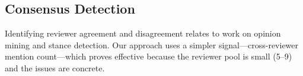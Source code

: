 \subsection{Consensus Detection}

Identifying reviewer agreement and disagreement relates to work on opinion mining and stance detection. Our approach uses a simpler signal---cross-reviewer mention count---which proves effective because the reviewer pool is small (5--9) and the issues are concrete.
